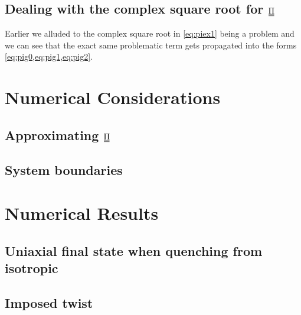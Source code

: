 \documentclass[12pt]{article}
\newcommand{\duf}[2]{\stackunder[0.5pt]{\stackunder[0.8pt]{\stackunder[1pt]{\ensuremath{#1}}{\rule{\widthof{\ensuremath{#2}}*\real{0.9}}{.1ex}}}{\rule{\widthof{\ensuremath{#2}}*\real{0.9}}{.1ex}}}{}}
\newcommand{\du}[1]{\duf{#1}{#1}}
\newcommand{\PP}{\ensuremath{\du{\Pi}}}
\begin{document}
    \subsection{Dealing with the complex square root for \PP}
        Earlier we alluded to the complex square root in \cref{eq:piex1} being a problem and we can see that the exact same problematic term gets propagated into the forms \cref{eq:pig0,eq:pig1,eq:pig2}.


\section{Numerical Considerations}
    \subsection{Approximating \PP{}}
    \subsection{System boundaries }

\section{Numerical Results}
    \subsection{Uniaxial final state when quenching from isotropic}
    \subsection{Imposed twist}
\end{document}

